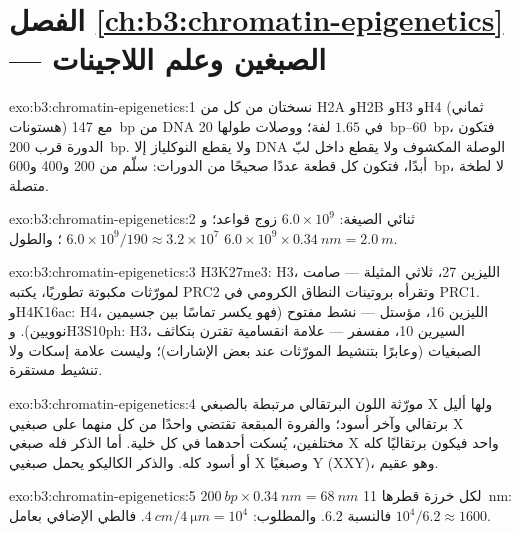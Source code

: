 \section*{الفصل \ref{ch:b3:chromatin-epigenetics} --- الصبغين وعلم اللاجينات}

\begin{solution}{exo:b3:chromatin-epigenetics:1}
نسختان من كل من H2A وH2B وH3 وH4 (ثماني هستونات) مع \qty{147}{bp}
من DNA في $1.65$ لفة؛ ووصلات طولها \qtyrange{20}{60}{bp}، فتكون
الدورة قرب \qty{200}{bp}. ولا يقطع النوكلياز إلا DNA الوصلة المكشوف
ولا يقطع داخل لبّ أبدًا، فتكون كل قطعة عددًا صحيحًا من الدورات:
سلّم من \num{200} و\num{400} و\qty{600}{bp}، لا لطخة متصلة.
\end{solution}

\begin{solution}{exo:b3:chromatin-epigenetics:2}
ثنائي الصيغة: $6.0\times 10^{9}$ زوج قواعد؛ و$6.0\times 10^{9}/190 \approx
3.2\times 10^{7}$ ؛ والطول $6.0\times 10^{9}\times
\qty{0.34}{nm} = \qty{2.0}{m}$.
\end{solution}

\begin{solution}{exo:b3:chromatin-epigenetics:3}
H3K27me3:  H3، الليزين 27، ثلاثي المثيلة ---  صامت
لمورّثات مكبوتة تطوريًا، يكتبه PRC2 وتقرأه بروتينات النطاق الكرومي
في PRC1. وH4K16ac:  H4، الليزين 16، مؤستل ---  نشط
مفتوح (فهو يكسر تماسًا بين جسيمين نوويين). وH3S10ph:  H3،
السيرين 10، مفسفر --- علامة انقسامية تقترن بتكاثف الصبغيات (وعابرًا
بتنشيط المورّثات عند بعض الإشارات)؛ وليست علامة إسكات ولا تنشيط
مستقرة.
\end{solution}

\begin{solution}{exo:b3:chromatin-epigenetics:4}
مورّثة اللون البرتقالي مرتبطة بالصبغي X ولها أليل برتقالي وآخر أسود؛
والفروة المبقعة تقتضي واحدًا من كل منهما على صبغيي X مختلفين، يُسكت
أحدهما في كل خلية. أما الذكر فله صبغي X واحد فيكون برتقاليًا كله أو
أسود كله. والذكر الكاليكو يحمل صبغيي X وصبغيًا Y (XXY)، وهو عقيم.
\end{solution}

\begin{solution}{exo:b3:chromatin-epigenetics:5}
$\qty{200}{bp}\times \qty{0.34}{nm} = \qty{68}{nm}$ لكل خرزة قطرها
\qty{11}{nm}: فالنسبة $6.2$. والمطلوب: $\qty{4}{cm}/\qty{4}{\micro m} =
10^{4}$. فالطي الإضافي بعامل $10^{4}/6.2 \approx 1600$.
\end{solution}

